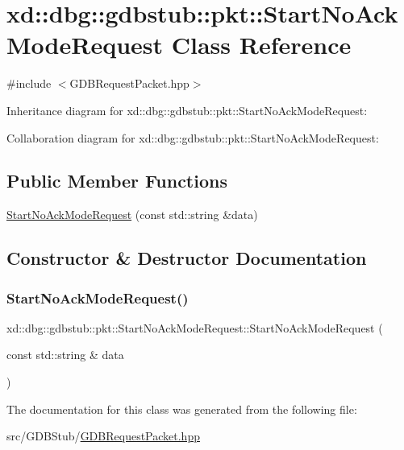 \hypertarget{classxd_1_1dbg_1_1gdbstub_1_1pkt_1_1_start_no_ack_mode_request}{}\section{xd\+:\+:dbg\+:\+:gdbstub\+:\+:pkt\+:\+:Start\+No\+Ack\+Mode\+Request Class Reference}
\label{classxd_1_1dbg_1_1gdbstub_1_1pkt_1_1_start_no_ack_mode_request}


{\ttfamily \#include $<$G\+D\+B\+Request\+Packet.\+hpp$>$}



Inheritance diagram for xd\+:\+:dbg\+:\+:gdbstub\+:\+:pkt\+:\+:Start\+No\+Ack\+Mode\+Request\+:


Collaboration diagram for xd\+:\+:dbg\+:\+:gdbstub\+:\+:pkt\+:\+:Start\+No\+Ack\+Mode\+Request\+:
\subsection*{Public Member Functions}
\begin{DoxyCompactItemize}
\item 
\mbox{\hyperlink{classxd_1_1dbg_1_1gdbstub_1_1pkt_1_1_start_no_ack_mode_request_a423e3bedf4f7defc1ab9aa5c559ebdaa}{Start\+No\+Ack\+Mode\+Request}} (const std\+::string \&data)
\end{DoxyCompactItemize}


\subsection{Constructor \& Destructor Documentation}
\mbox{\label{classxd_1_1dbg_1_1gdbstub_1_1pkt_1_1_start_no_ack_mode_request_a423e3bedf4f7defc1ab9aa5c559ebdaa}} 
\subsubsection{\texorpdfstring{Start\+No\+Ack\+Mode\+Request()}{StartNoAckModeRequest()}}
{\footnotesize\ttfamily xd\+::dbg\+::gdbstub\+::pkt\+::\+Start\+No\+Ack\+Mode\+Request\+::\+Start\+No\+Ack\+Mode\+Request (\begin{DoxyParamCaption}\item[{const std\+::string \&}]{data }\end{DoxyParamCaption})\hspace{0.3cm}{\ttfamily [inline]}}



The documentation for this class was generated from the following file\+:\begin{DoxyCompactItemize}
\item 
src/\+G\+D\+B\+Stub/\mbox{\hyperlink{_g_d_b_request_packet_8hpp}{G\+D\+B\+Request\+Packet.\+hpp}}\end{DoxyCompactItemize}
